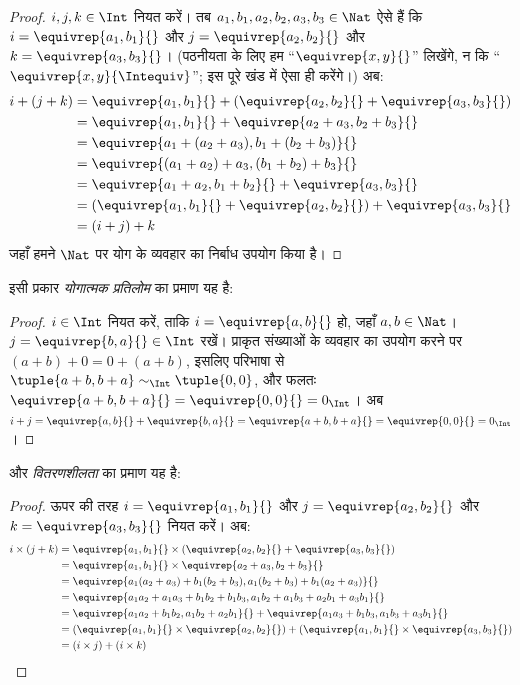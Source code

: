 \documentclass[../../../include/open-logic-section]{subfiles}
\begin{document}
\begin{proof} 
$i, j, k \in \Int$ नियत करें। तब $a_1, b_1, a_2, b_2, a_3, b_3 \in
\Nat$ ऐसे हैं कि $i = \equivrep{a_1, b_1}{}$ और $j =
\equivrep{a_2,b_2}{}$ और $k = \equivrep{a_3, b_3}{}$। (पठनीयता के लिए हम
``$\equivrep{x, y}{}$'' लिखेंगे, न कि ``$\equivrep{x, y}{\Intequiv}$'';
इस पूरे खंड में ऐसा ही करेंगे।) अब:
\begin{align*}
	i + (j + k) &= \equivrep{a_1, b_1}{}+(\equivrep{a_2, b_2}{} + \equivrep{a_3, b_3}{}) \\
	&= \equivrep{a_1,  b_1}{} + \equivrep{a_2+a_3, b_2+b_3}{}\\
	&= \equivrep{a_1 + (a_2 + a_3), b_1 + (b_2 + b_3)}{}\\
	&= \equivrep{(a_1 + a_2) + a_3, (b_1 + b_2) + b_3}{}\\
	&= \equivrep{a_1 + a_2, b_1 + b_2}{} + \equivrep{a_3, b_3}{}\\
	&= (\equivrep{a_1, b_1}{} + \equivrep{a_2, b_2}{}) + \equivrep{a_3, b_3}{}\\
	&= (i+j) + k
\end{align*}
जहाँ हमने $\Nat$ पर योग के व्यवहार का निर्बाध उपयोग किया है।
\end{proof}

इसी प्रकार \emph{योगात्मक प्रतिलोम} का प्रमाण यह है:

\begin{proof}
$i \in \Int$ नियत करें, ताकि $i = \equivrep{a,b}{}$ हो, जहाँ $a,b \in
\Nat$। $j = \equivrep{b,a}{} \in \Int$
रखें। प्राकृत संख्याओं के व्यवहार का उपयोग करने पर $(a+b) + 0 = 0 + (a+b)$,
इसलिए परिभाषा से $\tuple{a+b, b+a} \sim_\Int \tuple{0,0}$, और फलतः
$\equivrep{a+b, b+a}{} = \equivrep{0, 0}{} = 0_\Int$। अब $i + j =
\equivrep{a,b}{}+\equivrep{b,a}{}=\equivrep{a+b, b+a}{}= \equivrep{0,
0}{} = 0_\Int$।
\end{proof}

और \emph{वितरणशीलता} का प्रमाण यह है:

\begin{proof}
ऊपर की तरह $i = \equivrep{a_1, b_1}{}$ और $j =
\equivrep{a_2,b_2}{}$ और $k = \equivrep{a_3, b_3}{}$ नियत करें। अब:
\begin{align*}
	i \times (j + k) 
	&= \equivrep{a_1, b_1}{} \times (\equivrep{a_2,b_2}{} + \equivrep{a_3, b_3}{})\\
	&= \equivrep{a_1, b_1}{} \times \equivrep{a_2 + a_3,b_2+b_3}{}\\
	&= \equivrep{a_1  (a_2 + a_3) + b_1  (b_2+b_3), a_1  (b_2 + b_3) + b_1 (a_2 + a_3)}{}\\
	&= \equivrep{a_1 a_2 + a_1a_3 + b_1 b_2+b_1b_3, a_1 b_2 + a_1b_3 + a_2b_1 + a_3b_1}{}\\		
	&= \equivrep{a_1a_2 + b_1b_2, a_1b_2 + a_2b_1}{} + \equivrep{a_1a_3 + b_1b_3, a_1b_3 + a_3b_1}{}\\
	&= (\equivrep{a_1, b_1}{} \times \equivrep{a_2,b_2}{}) + (\equivrep{a_1, b_1}{} \times  \equivrep{a_3, b_3}{})\\
	&= (i \times j) + (i \times k)
\end{align*}
\end{proof}
\end{document}
